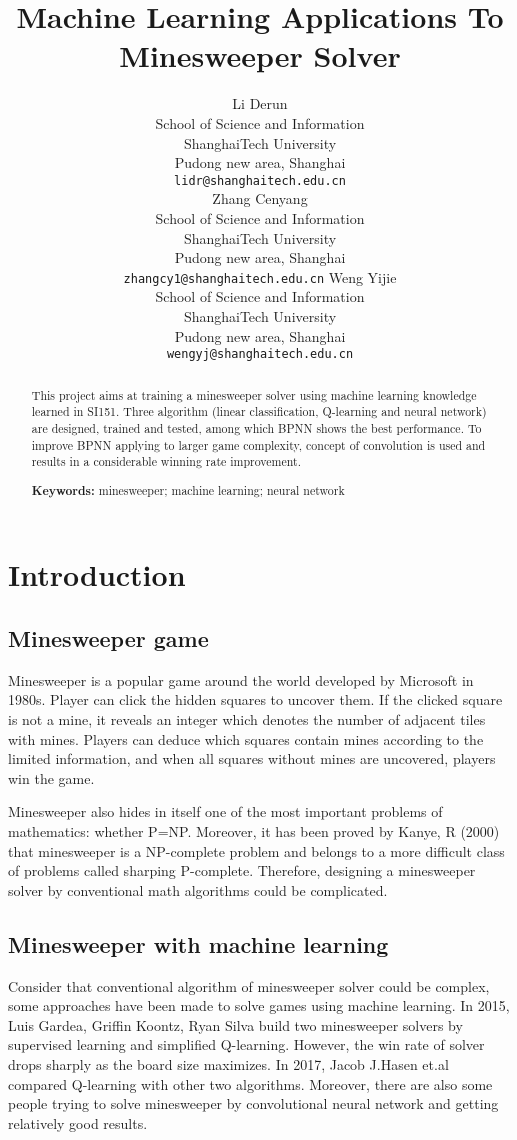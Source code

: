 \documentclass{article}
\title{Machine Learning Applications To Minesweeper Solver}
\author{
	Li Derun\\
	School of Science and Information\\
	ShanghaiTech University\\
	Pudong new area, Shanghai  \\
	\texttt{lidr@shanghaitech.edu.cn} \\
	\And
	Zhang Cenyang \\
	School of Science and Information \\
	ShanghaiTech University\\
	Pudong new area, Shanghai\\
	\texttt{zhangcy1@shanghaitech.edu.cn}
	\AND
	Weng Yijie \\
	School of Science and Information \\
	ShanghaiTech University \\
	Pudong new area, Shanghai\\
	\texttt{wengyj@shanghaitech.edu.cn}
}
\begin{document}
\maketitle

\begin{abstract}
  This project aims at training a minesweeper solver using machine learning knowledge learned in SI151. Three algorithm (linear classification, Q-learning and neural network) are designed, trained and tested, among which BPNN shows the best performance. To improve BPNN applying to larger game complexity, concept of convolution is used and results in a considerable winning rate improvement.\\
  
  \par\textbf{Keywords: } minesweeper; machine learning; neural network
\end{abstract}

\section{Introduction}



\subsection{Minesweeper game}
Minesweeper is a popular game around the world developed by Microsoft in 1980s. Player can click the hidden squares to uncover them. If the clicked square is not a mine, it reveals an integer which denotes the number of adjacent tiles with mines. Players can deduce which squares contain mines according to the limited information, and when all squares without mines are uncovered, players win the game. 

Minesweeper also hides in itself one of the most important problems of mathematics: whether P=NP. Moreover, it has been proved by Kanye, R (2000) that minesweeper is a NP-complete problem and belongs to a more difficult class of problems called sharping P-complete. Therefore, designing a minesweeper solver by conventional math algorithms could be complicated.

\subsection{Minesweeper with machine learning}
Consider that conventional algorithm of minesweeper solver could be complex, some approaches have been made to solve games using machine learning. In 2015, Luis Gardea, Griffin Koontz, Ryan Silva build two minesweeper solvers by supervised learning and simplified Q-learning. However, the win rate of solver drops sharply as the board size maximizes. In 2017, Jacob J.Hasen et.al compared Q-learning with other two algorithms. Moreover, there are also some people trying to solve minesweeper by convolutional neural network and getting relatively good results.
\end{document}
